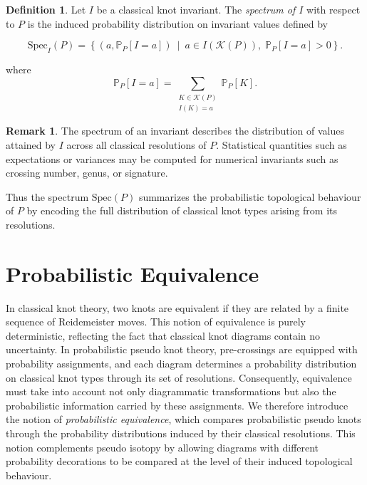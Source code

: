 \documentclass[a4paper, reqno, 12pt]{amsart}
\theoremstyle{plain}
\theoremstyle{definition}
\newtheorem{definition}[theorem]{Definition}
\newtheorem{remark}[theorem]{Remark}
\begin{document}
\begin{definition}\label{def:spectrum-invariant}
Let $I$ be a classical knot invariant. The \emph{spectrum of $I$} with respect to $P$ is the induced probability distribution on invariant values defined by

\[
\mathrm{Spec}_I(P)
=
\left\{
(a,\mathbb P_P[I=a])
\ \middle|\
a\in I(\mathcal K(P)),\;
\mathbb P_P[I=a]>0
\right\}.
\]

where
\[
\mathbb P_P[I=a]
=
\sum_{\substack{K\in\mathcal K(P)\\ I(K)=a}}
\mathbb P_P[K].
\]
\end{definition}


\begin{remark}\rm
The spectrum of an invariant describes the distribution of values attained by $I$ across all classical resolutions of $P$. Statistical quantities such as expectations or variances may be computed for numerical invariants such as crossing number, genus, or signature.
\end{remark}


Thus the spectrum $\mathrm{Spec}(P)$ summarizes the probabilistic topological behaviour of $P$ by encoding the full distribution of classical knot types arising from its resolutions.



\section{Probabilistic Equivalence}\label{sec:probeq}

In classical knot theory, two knots are equivalent if they are related by a finite sequence of Reidemeister moves. This notion of equivalence is purely deterministic, reflecting the fact that classical knot diagrams contain no uncertainty. In probabilistic pseudo knot theory, pre-crossings are equipped with probability assignments, and each diagram determines a probability distribution on classical knot types through its set of resolutions. Consequently, equivalence must take into account not only diagrammatic transformations but also the probabilistic information carried by these assignments. We therefore introduce the notion of \emph{probabilistic equivalence}, which compares probabilistic pseudo knots through the probability distributions induced by their classical resolutions. This notion complements pseudo isotopy by allowing diagrams with different probability decorations to be compared at the level of their induced topological behaviour.
\end{document}
